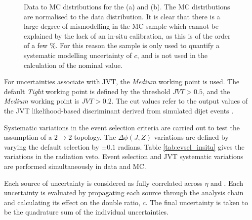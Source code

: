\begin{figure}[t]
\begin{subfigure}[b]{0.48\textwidth}
    \caption{}
    \label{fig:insitupt:b}
\end{subfigure}
\caption{Data to MC distributions for the \ptJ (a) and \ptref (b). The MC distributions are normalised to the data distribution. It is clear that there is a large degree of mismodelling in the \POWPY MC sample which cannot be explained by the lack of an in-situ calibration, as this is of the order of a few \%. For this reason the \POWPY sample is only used to quantify a systematic modelling uncertainty of $c$, and is not used in the calculation of the nominal value.\label{fig:insitu:mismodelling}}%
\end{figure}

For uncertainties associate with JVT, the \textit{Medium} working point is used. The default \textit{Tight} working point is defined by the threshold $JVT > 0.5$, and the \textit{Medium} working point is $JVT > 0.2$. The cut values refer to the output values of the JVT likelihood-based discriminant derived from simulated dijet events \cite{Insitu:JVT}.

Systematic variations in the event selection criteria are carried out to test the assumption of a $2\rightarrow2$ topology. The $\Delta\phi(J,Z)$ variations are defined by varying the default selection by $\pm0.1$ radians. Table \ref{tab:evsel_insitu} gives the variations in the radiation veto. Event selection and JVT systematic variations are performed simultaneously in data and MC. 

Each source of uncertainty is considered as fully correlated across $\eta$ and \pt. Each uncertainty is evaluated by propagating each source through the analysis chain and calculating its effect on the double ratio, $c$. The final uncertainty is taken to be the quadrature sum of the individual uncertainties.


